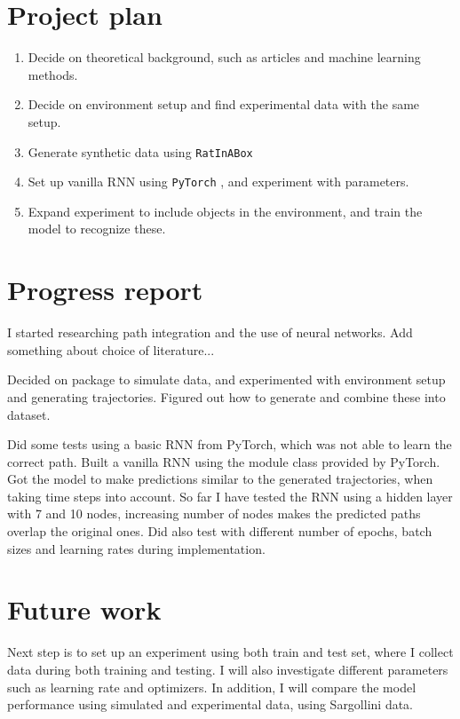\section{Project plan}\label{sec:project_plan}
\begin{enumerate}
    \item Decide on theoretical background, such as articles and machine learning methods.
    \item Decide on environment setup and find experimental data with the same setup.
    \item Generate synthetic data using \verb|RatInABox| \cite{george:2022:ratinabox}
    \item Set up vanilla RNN using \verb|PyTorch| \cite{2017:pytorch}, and experiment with parameters.
    \item Expand experiment to include objects in the environment, and train the model to recognize these.
\end{enumerate}


\section{Progress report}\label{sec:progress_report}
I started researching path integration and the use of neural networks. Add something about choice of literature...

Decided on package to simulate data, and experimented with environment setup and generating trajectories. Figured out how to generate and combine these into dataset.

Did some tests using a basic RNN from PyTorch, which was not able to learn the correct path. Built a vanilla RNN using the module class provided by PyTorch. Got the model to make predictions similar to the generated trajectories, when taking time steps into account. So far I have tested the RNN using a hidden layer with 7 and 10 nodes, increasing number of nodes makes the predicted paths overlap the original ones. Did also test with different number of epochs, batch sizes and learning rates during implementation. 


\section{Future work}\label{sec:future_work}
Next step is to set up an experiment using both train and test set, where I collect data during both training and testing. I will also investigate different parameters such as learning rate and optimizers. In addition, I will compare the model performance using simulated and experimental data, using Sargollini data.